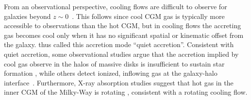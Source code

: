 \documentclass[fleqn,usenatbib]{mnras}
\newcommand{\Rvir}{R_{\rm vir}}
\begin{document}

From an observational perspective, cooling flows are difficult to observe for galaxies beyond $z\sim0$~\citep{Putman2012}.
This follows since cool CGM gas is typically more accessible to observations than the hot CGM, but in cooling flows the accreting gas becomes cool only when it has no significant spatial or kinematic offset from the galaxy.
\citeauthor{Putman2012} thus called this accretion mode ``quiet accretion''. 
Consistent with quiet accretion, some observational studies argue that the accretion implied by cool gas observe in the halos of massive disks is insufficient to sustain star formation \citep[e.g.][]{Sancisi2008, Binney+09}, while others detect ionized, inflowing gas at the galaxy-halo interface~\citep{Zheng2017}. Furthermore, X-ray absorption studies suggest that hot gas in the inner CGM of the Milky-Way is rotating \citep{Hodges-Kluck2016}, consistent with a rotating cooling flow. 
\end{document}
